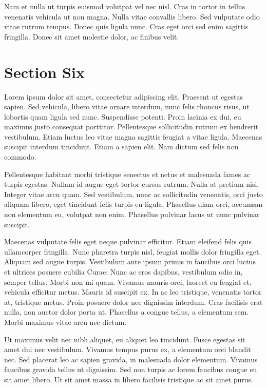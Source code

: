 \documentclass[runningheads,a4paper]{llncs}
\begin{document}
Nam et nulla ut turpis euismod volutpat vel nec nisl. Cras in tortor in tellus venenatis vehicula ut non magna. Nulla vitae convallis libero. Sed vulputate odio vitae rutrum tempus. Donec quis ligula nunc. Cras eget orci sed enim sagittis fringilla. Donec sit amet molestie dolor, ac finibus velit.
%
\newpage
%
\section{Section Six}
%
Lorem ipsum dolor sit amet, consectetur adipiscing elit. Praesent ut egestas sapien. Sed vehicula, libero vitae ornare interdum, nunc felis rhoncus risus, ut lobortis quam ligula sed nunc. Suspendisse potenti. Proin lacinia ex dui, eu maximus justo consequat porttitor. Pellentesque sollicitudin rutrum ex hendrerit vestibulum. Etiam luctus leo vitae magna sagittis feugiat a vitae ligula. Maecenas suscipit interdum tincidunt. Etiam a sapien elit. Nam dictum sed felis non commodo.

Pellentesque habitant morbi tristique senectus et netus et malesuada fames ac turpis egestas. Nullam id augue eget tortor cursus rutrum. Nulla at pretium nisi. Integer vitae arcu quam. Sed vestibulum, nunc ac sollicitudin venenatis, orci justo aliquam libero, eget tincidunt felis turpis eu ligula. Phasellus diam orci, accumsan non elementum eu, volutpat non enim. Phasellus pulvinar lacus ut nunc pulvinar suscipit.

Maecenas vulputate felis eget neque pulvinar efficitur. Etiam eleifend felis quis ullamcorper fringilla. Nunc pharetra turpis nisl, feugiat mollis dolor fringilla eget. Aliquam sed augue turpis. Vestibulum ante ipsum primis in faucibus orci luctus et ultrices posuere cubilia Curae; Nunc ac eros dapibus, vestibulum odio in, semper tellus. Morbi non mi quam. Vivamus mauris orci, laoreet eu feugiat et, vehicula efficitur metus. Mauris id suscipit ex. In ac leo tristique, venenatis tortor at, tristique metus. Proin posuere dolor nec dignissim interdum. Cras facilisis erat nulla, non auctor dolor porta ut. Phasellus a congue tellus, a elementum sem. Morbi maximus vitae arcu nec dictum.

Ut maximus velit nec nibh aliquet, eu aliquet leo tincidunt. Fusce egestas sit amet dui nec vestibulum. Vivamus tempus purus ex, a elementum orci blandit nec. Sed placerat leo ac sapien gravida, in malesuada dolor elementum. Vivamus faucibus gravida tellus ut dignissim. Sed non turpis ac lorem faucibus congue eu sit amet libero. Ut sit amet massa in libero facilisis tristique ac sit amet purus.
\end{document}
